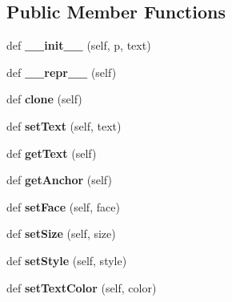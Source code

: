 \subsection*{Public Member Functions}
\begin{DoxyCompactItemize}
\item 
def {\bfseries \+\_\+\+\_\+init\+\_\+\+\_\+} (self, p, text)\hypertarget{classgraphics_1_1_text_af17676ed39bcc03a78098b22a15ef591}{}\label{classgraphics_1_1_text_af17676ed39bcc03a78098b22a15ef591}

\item 
def {\bfseries \+\_\+\+\_\+repr\+\_\+\+\_\+} (self)\hypertarget{classgraphics_1_1_text_ae0b4ff4a08c45410d4f424a48a6eba59}{}\label{classgraphics_1_1_text_ae0b4ff4a08c45410d4f424a48a6eba59}

\item 
def {\bfseries clone} (self)\hypertarget{classgraphics_1_1_text_a507a4eea3a7a7de19bfe30ff70cf8fd6}{}\label{classgraphics_1_1_text_a507a4eea3a7a7de19bfe30ff70cf8fd6}

\item 
def {\bfseries set\+Text} (self, text)\hypertarget{classgraphics_1_1_text_ab8a97b69fe919acb98429b7da81b7d37}{}\label{classgraphics_1_1_text_ab8a97b69fe919acb98429b7da81b7d37}

\item 
def {\bfseries get\+Text} (self)\hypertarget{classgraphics_1_1_text_a1697a465c237e26532f43cef1af6abe5}{}\label{classgraphics_1_1_text_a1697a465c237e26532f43cef1af6abe5}

\item 
def {\bfseries get\+Anchor} (self)\hypertarget{classgraphics_1_1_text_a02525bc36e0af653d17905cd733d0843}{}\label{classgraphics_1_1_text_a02525bc36e0af653d17905cd733d0843}

\item 
def {\bfseries set\+Face} (self, face)\hypertarget{classgraphics_1_1_text_ae58860c5531b95e69136a819489a3169}{}\label{classgraphics_1_1_text_ae58860c5531b95e69136a819489a3169}

\item 
def {\bfseries set\+Size} (self, size)\hypertarget{classgraphics_1_1_text_a31ea18b7a09603cdb49a4716290ec8fe}{}\label{classgraphics_1_1_text_a31ea18b7a09603cdb49a4716290ec8fe}

\item 
def {\bfseries set\+Style} (self, style)\hypertarget{classgraphics_1_1_text_af2697684710c7471abe9bc8bf0f5fffe}{}\label{classgraphics_1_1_text_af2697684710c7471abe9bc8bf0f5fffe}

\item 
def {\bfseries set\+Text\+Color} (self, color)\hypertarget{classgraphics_1_1_text_a4ee730f2d0f9a81250b8ca232940fec8}{}\label{classgraphics_1_1_text_a4ee730f2d0f9a81250b8ca232940fec8}

\end{DoxyCompactItemize}
